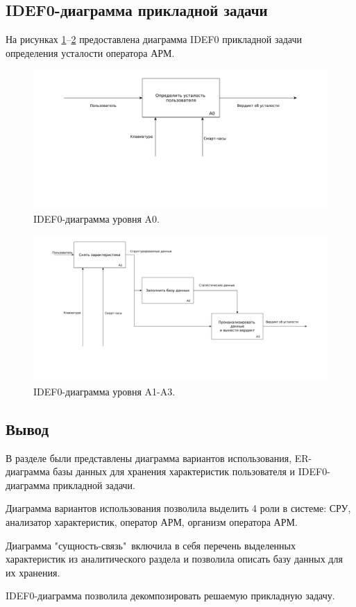 \subsection{IDEF0-диаграмма прикладной задачи}
На рисунках \ref{fig:idef:0}--\ref{fig:idef:1} предоставлена диаграмма IDEF0 прикладной задачи определения усталости оператора АРМ.

\begin{figure}[H]
	\centering
	\includegraphics[width=\textwidth]{img/A0.pdf}
	\caption{IDEF0-диаграмма уровня A0.}
	\label{fig:idef:0}
\end{figure}

\begin{figure}[H]
	\centering
	\includegraphics[scale=0.3]{img/A123.pdf}
	\caption{IDEF0-диаграмма уровня A1-A3.}
	\label{fig:idef:1}
\end{figure}

\subsection*{Вывод}
В разделе были представлены диаграмма вариантов использования, ER-диаграмма базы данных для хранения характеристик пользователя и IDEF0-диаграмма прикладной задачи.

Диаграмма вариантов использования позволила выделить 4 роли в системе: СРУ, анализатор характеристик, оператор АРМ, организм оператора АРМ.

Диаграмма "сущность-связь"\ включила в себя перечень выделенных характеристик из аналитического раздела и позволила описать базу данных для их хранения.

IDEF0-диаграмма позволила декомпозировать решаемую прикладную задачу.

\pagebreak